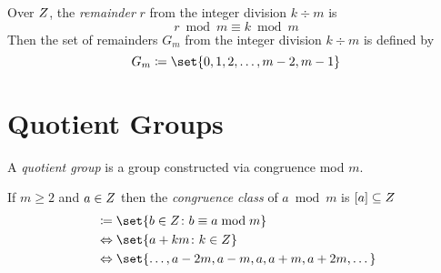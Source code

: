 \begin{definition}
    Over $\relax{Z}$, the \textit{remainder} $r$ from the integer division $k \div m$ is \begin{equation}
        r \bmod m \equiv k \bmod m
    \end{equation}
    Then the set of remainders $G_m$ from the integer division $k \div m$ is defined by
    \begin{equation}
        G_m \coloneqq \set{0, 1, 2, \dots, m - 2, m - 1}
    \end{equation}
\end{definition}

\section{Quotient Groups}
\begin{definition}
    A \textit{quotient group} is a group constructed via congruence mod $m$.
\end{definition}

\begin{definition}
    If $m \ge 2$ and $a \in \relax{Z}$ then the \textit{congruence class} of $a \bmod m$ is $[a] \subseteq \relax{Z}$
    \begin{align}
        [a] &\coloneqq \set{b \in \Int \colon b \equiv a \bmod m} \\
        & \Leftrightarrow \set{a + km \colon k \in \Int} \\
        & \Leftrightarrow \set{\dots, a - 2m, a - m, a, a + m, a + 2m, \dots}
    \end{align}
\end{definition}

